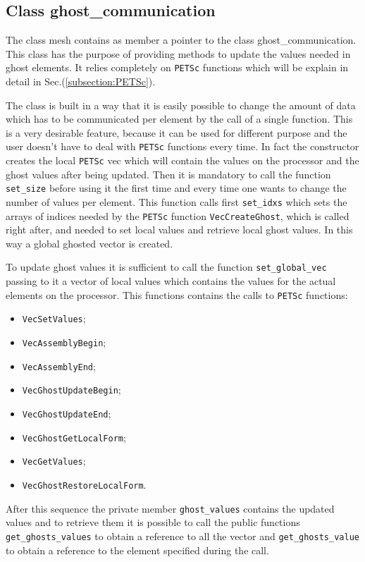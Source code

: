 \subsection{Class ghost\_communication}\label{subsection:ghost_communication}
The class mesh contains as member a pointer to the class ghost\_communication. This class has the purpose of providing methods to update the values needed in ghost elements. It relies completely on \verb|PETSc| functions which will be explain in detail in  Sec.(\ref{subsection:PETSc}).

The class is built in a way that it is easily possible to change the amount of data which has to be communicated per element by the call of a single function. This is a very desirable feature, because it can be used for different purpose and the user doesn't have to deal with \verb|PETSc| functions every time. In fact the constructor creates the local \verb|PETSc| vec which will contain the values on the processor and the ghost values after being updated. Then it is mandatory to call the function \verb|set_size| before using it the first time and every time one wants to change the number of values per element. This function calls first \verb|set_idxs| which sets the arrays of indices needed by the \verb|PETSc| function \verb|VecCreateGhost|, which is called right after, and needed to set local values and retrieve local ghost values. In this way a global ghosted vector is created.

To update ghost values it is sufficient to call the function \verb|set_global_vec| passing to it a vector of local values which contains the values for the actual elements on the processor. This functions contains the calls to \verb|PETSc| functions:

\begin{itemize}
\item \verb|VecSetValues|;
\item \verb|VecAssemblyBegin|;
\item \verb|VecAssemblyEnd|;
\item \verb|VecGhostUpdateBegin|;
\item \verb|VecGhostUpdateEnd|;
\item \verb|VecGhostGetLocalForm|;
\item \verb|VecGetValues|;
\item \verb|VecGhostRestoreLocalForm|.
\end{itemize}

After this sequence the private member \verb|ghost_values| contains the updated values and to retrieve them it is possible to call the public functions \verb|get_ghosts_values| to obtain a reference to all the vector and  \verb|get_ghosts_value| to obtain a reference to the element specified during the call.

